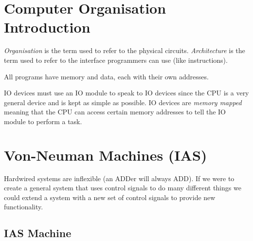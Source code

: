 \section{Computer Organisation Introduction}\label{sec:computer_organisation_introduction}

\emph{Organisation} is the term used to refer to the physical circuits.
\emph{Architecture} is the term used to refer to the interface programmers can use (like instructions).

All programs have memory and data, each with their own addresses.

IO devices must use an IO module to speak to IO devices since the CPU is a very general device and is kept as simple as possible.
IO devices are \emph{memory mapped} meaning that the CPU can access certain memory addresses to tell the IO module to perform a task.

\section{Von-Neuman Machines (IAS)}\label{sec:von_neuman_machines_ias_}

Hardwired systems are inflexible (an ADDer will always ADD).
If we were to create a general system that uses control signals to do many different things we could extend a system with a new set of control signals to provide new functionality.

\subsection{IAS Machine}\label{sub:ias_machine}

